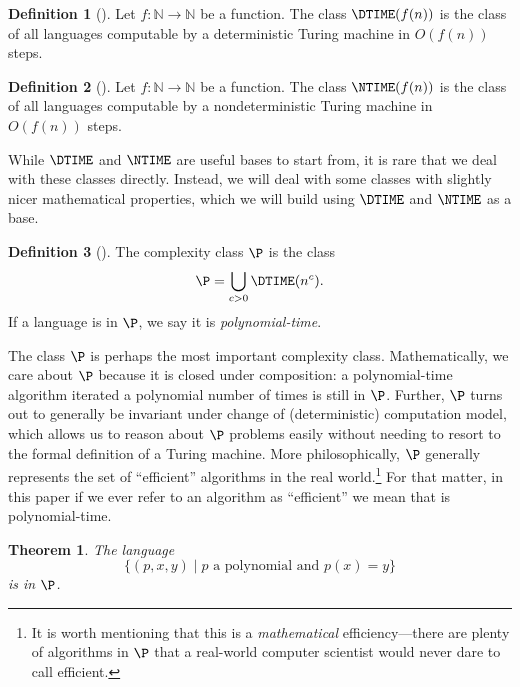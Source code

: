 \documentclass[english,12pt]{reedthesis}
\theoremstyle{plain}
\newtheorem{thm}{Theorem}[section]
\theoremstyle{definition}
\newtheorem{defn}[defn]{Definition}
\theoremstyle{remark}
\begin{document}
\begin{defn}[{\cite[Def.\ 1.19]{AB09}}]\label{def:dtime}
  Let $f\colon \mathbb{N} \rightarrow \mathbb{N}$ be a function. The class $\DTIME(f(n))$ is the class of
  all languages computable by a deterministic Turing machine in $O(f(n))$ steps.
\end{defn}

\begin{defn}[{\cite[Def.\ 2.5]{AB09}}]\label{def:ntime}
  Let $f\colon \mathbb{N} \rightarrow \mathbb{N}$ be a function. The class $\NTIME(f(n))$ is the class of
  all languages computable by a nondeterministic Turing machine in $O(f(n))$
  steps.
\end{defn}

While $\DTIME$ and $\NTIME$ are useful bases to start from, it is rare that we
deal with these classes directly. Instead, we will deal with some classes with
slightly nicer mathematical properties, which we will build using $\DTIME$ and
$\NTIME$ as a base.

\begin{defn}[{\cite[Def.\ 1.20]{AB09}}]%
  \label{def:p}
  The complexity class $\P$ is the class
  \[
    \P = \bigcup_{c > 0}\DTIME(n^{c}).
  \]
  If a language is in $\P$, we say it is \emph{polynomial-time}.
\end{defn}

The class $\P$ is perhaps the most important complexity class. Mathematically,
we care about $\P$ because it is closed under composition: a polynomial-time
algorithm iterated a polynomial number of times is still in $\P$. Further, $\P$
turns out to generally be invariant under change of (deterministic) computation
model, which allows us to reason about $\P$ problems easily without needing to
resort to the formal definition of a Turing machine. More philosophically, $\P$
generally represents the set of ``efficient'' algorithms in the real
world.\footnote{It is worth mentioning that this is a \emph{mathematical}
  efficiency---there are plenty of algorithms in $\P$ that a real-world computer
  scientist would never dare to call efficient.} For that matter, in this paper
if we ever refer to an algorithm as ``efficient'' we mean that is
polynomial-time.

\begin{thm}\label{thm:polynomial-is-p}
  The language
  \[
    \{(p, x, y) \mid p \text{ a polynomial and } p(x) = y\}
  \]
  is in $\P$.
\end{thm}
\end{document}
